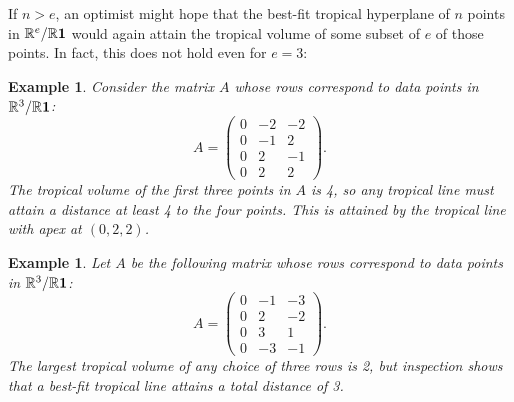 \documentclass[12pt]{extarticle}
\numberwithin{theorem}{section}
\newtheorem{example}[theorem]{Example}
\newcommand{\RR}{\mathbb{R}}
\begin{document}
If $n > e$, an optimist might hope that the best-fit tropical hyperplane of $n$ points in $\RR^e/\RR{\bf 1}$ would again attain the tropical volume of some subset of $e$ of those points. In fact, this does not hold even for $e = 3$:
\begin{example}\label{a34exam}
Consider the matrix $A$ whose rows correspond to data points in $\RR^3/\RR {\bf 1}$:
\[A = \begin{pmatrix}0 & -2 & -2\\ 0 & -1 & 2\\ 0 & 2 & -1\\ 0 & 2 & 2\end{pmatrix}.\]
The tropical volume of the first three points in $A$ is 4, so any tropical line must attain a distance at least 4 to the four points. This is attained by the tropical line with apex at $(0, 2, 2)$.
\end{example}

\begin{figure}[!ht]
\begin{floatrow}
\end{floatrow}
\end{figure}
\begin{example}
\label{sad-example}
Let $A$ be the following matrix whose rows correspond to data points in $\RR^3/\RR {\bf 1}$:
\[A = \begin{pmatrix}0 & -1 & -3\\ 0 & 2 & -2\\0 & 3 & 1 \\ 0 & -3 & -1\end{pmatrix}.\]
The largest tropical volume of any choice of three rows is 2, but inspection shows that a best-fit tropical line attains a total distance of 3.
\end{example}
\end{document}
